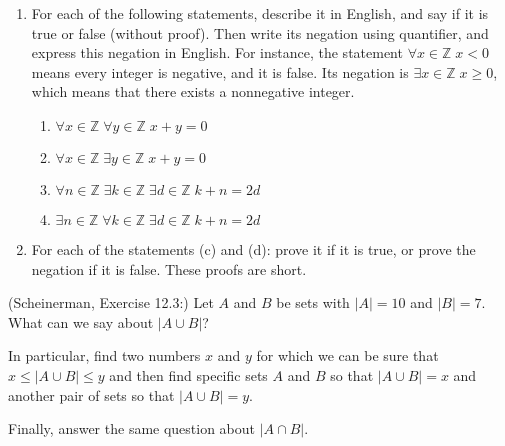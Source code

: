 \documentclass{article}
\theoremstyle{definition}
\begin{document}
\begin{question}
\begin{enumerate}
	\item For each of the following statements, describe it in English, and say if it is true or false (without proof). Then write its negation using quantifier, and express this negation in English. For instance, the statement $\forall x \in \mathbb{Z} \; x < 0$ means every integer is negative, and it is false. Its negation is $\exists x \in \mathbb{Z} \; x \geq 0$, which means that there exists a nonnegative integer.
	
	\begin{enumerate}
		\item $\forall x \in \mathbb{Z} \; \forall y \in \mathbb{Z} \; x + y = 0$
		\item $\forall x \in \mathbb{Z} \; \exists y \in \mathbb{Z} \; x + y = 0$
		\item $\forall n \in \mathbb{Z} \; \exists k \in \mathbb{Z} \; \exists d \in \mathbb{Z} \; k+ n = 2d$
		\item $\exists n \in \mathbb{Z} \; \forall k \in \mathbb{Z} \; \exists d \in \mathbb{Z} \; k+ n = 2d$
	\end{enumerate}
	
	\item For each of the statements (c) and (d): prove it if it is true, or prove the negation if it is false. These proofs are short.
\end{enumerate}
\end{question}
\begin{solution}
\end{solution}


\begin{question}
    (Scheinerman, Exercise 12.3:)
    Let $A$ and $B$ be sets with $|A| = 10$ and $|B| = 7$.
    What can we say about $|A\cup B|$?
    
    In particular, find two numbers $x$ and $y$ for which we can be sure that $x \leq |A \cup B| \leq y$ and then find specific sets $A$ and $B$ so that $|A \cup B| = x$ and another pair of sets so that $|A \cup B| = y$.
    
    Finally, answer the same question about $|A\cap B|$.  
\end{question}
\begin{solution}
\end{solution}
\end{document}
